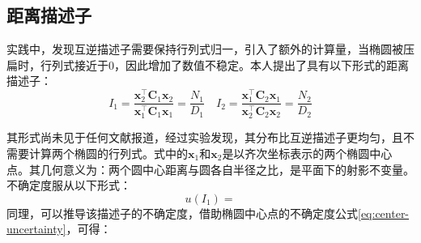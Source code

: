 \documentclass{article}
\begin{document}
\subsection{距离描述子}
实践中，发现互逆描述子需要保持行列式归一，引入了额外的计算量，当椭圆被压扁时，行列式接近于0，因此增加了数值不稳定。本人提出了具有以下形式的距离描述子：
\begin{equation*}
  I_1 = \frac{\mathbf{x}_2^\top\mathbf{C}_1\mathbf{x}_2}{\mathbf{x}_1^\top\mathbf{C}_1\mathbf{x}_1}=\frac{N_1}{D_1}\quad I_2 = \frac{\mathbf{x}_1^\top\mathbf{C}_2\mathbf{x}_1}{\mathbf{x}_2^\top\mathbf{C}_2\mathbf{x}_2}=\frac{N_2}{D_2}
\end{equation*}\par
其形式尚未见于任何文献报道，经过实验发现，其分布比互逆描述子更均匀，且不需要计算两个椭圆的行列式。式中的$\mathbf{x}_1$和$\mathbf{x}_2$是以齐次坐标表示的两个椭圆中心点。其几何意义为：两个圆中心距离与圆各自半径之比，是平面下的射影不变量。不确定度服从以下形式：
\begin{equation*}
  u(I_1)=
\end{equation*}
同理，可以推导该描述子的不确定度，借助椭圆中心点的不确定度公式\ref{eq:center-uncertainty}，可得：
\end{document}
